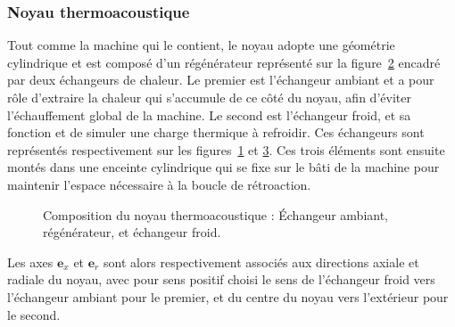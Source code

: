 \subsubsection{Noyau thermoacoustique}
Tout comme la machine qui le contient, le noyau adopte une géométrie cylindrique et est composé d'un régénérateur représenté sur la figure~\ref{fig:TacotPhotos_Regen} encadré par deux échangeurs de chaleur. Le premier est l'échangeur ambiant et a pour rôle d'extraire la chaleur qui s'accumule de ce côté du noyau, afin d'éviter l'échauffement global de la machine. Le second est l'échangeur froid, et sa fonction et de simuler une charge thermique à refroidir. Ces échangeurs sont représentés respectivement sur les figures~\ref{fig:TacotPhotos_AHX} et \ref{fig:TacotPhotos_CHX}. Ces trois éléments sont ensuite montés dans une enceinte cylindrique qui se fixe sur le bâti de la machine pour maintenir l'espace nécessaire à la boucle de rétroaction.

\begin{figure}[!ht]
    \centering
	\begin{subfigure}{.32\textwidth}
		\centering
		\caption{}
		\label{fig:TacotPhotos_AHX}
	\end{subfigure}		
	\begin{subfigure}{.32\textwidth}
		\centering
		\caption{}
		\label{fig:TacotPhotos_Regen}
	\end{subfigure}	
	\begin{subfigure}{.32\textwidth}
		\centering
		\caption{}
		\label{fig:TacotPhotos_CHX}
	\end{subfigure}	    
    \caption{Composition du noyau thermoacoustique :  \'Echangeur ambiant,  régénérateur, et  échangeur froid.}
    \label{fig:TacotPhotos}
\end{figure}


Les axes $\mathbf e_x$ et $\mathbf e_r$ sont alors respectivement associés aux directions axiale et radiale du noyau,  avec pour sens positif choisi le sens de l'échangeur froid vers l'échangeur ambiant pour le premier, et du centre du noyau vers l'extérieur pour le second.\medskip

